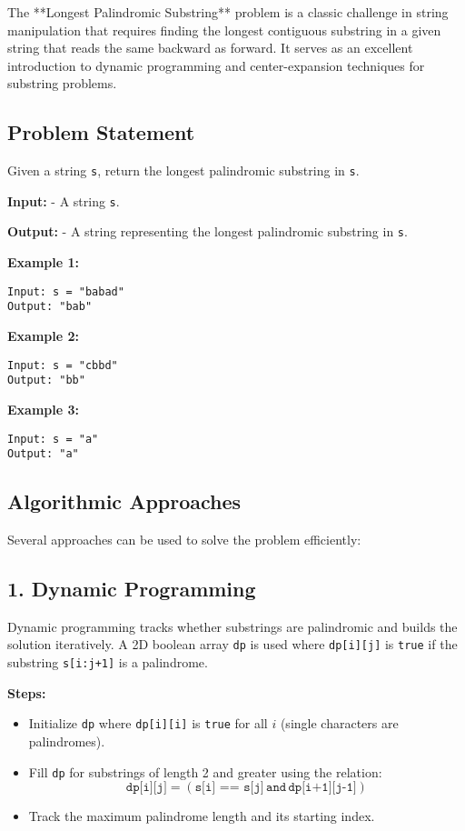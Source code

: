 
\label{problem:Longest_Palindromic_Substring}

The **Longest Palindromic Substring** problem is a classic challenge in string manipulation that requires finding the longest contiguous substring in a given string that reads the same backward as forward. It serves as an excellent introduction to dynamic programming and center-expansion techniques for substring problems.

\subsection*{Problem Statement}
Given a string \texttt{s}, return the longest palindromic substring in \texttt{s}.

\textbf{Input:}
- A string \texttt{s}.

\textbf{Output:}
- A string representing the longest palindromic substring in \texttt{s}.

\textbf{Example 1:}
\begin{verbatim}
Input: s = "babad"
Output: "bab"
\end{verbatim}

\textbf{Example 2:}
\begin{verbatim}
Input: s = "cbbd"
Output: "bb"
\end{verbatim}

\textbf{Example 3:}
\begin{verbatim}
Input: s = "a"
Output: "a"
\end{verbatim}

\subsection*{Algorithmic Approaches}
Several approaches can be used to solve the problem efficiently:

\subsection*{1. Dynamic Programming}
Dynamic programming tracks whether substrings are palindromic and builds the solution iteratively. A 2D boolean array \texttt{dp} is used where \texttt{dp[i][j]} is \texttt{true} if the substring \texttt{s[i:j+1]} is a palindrome.

\textbf{Steps:}
\begin{itemize}
    \item Initialize \texttt{dp} where \texttt{dp[i][i]} is \texttt{true} for all \(i\) (single characters are palindromes).
    \item Fill \texttt{dp} for substrings of length 2 and greater using the relation:
    \[
    \texttt{dp[i][j]} = (\texttt{s[i] == s[j]} \, \texttt{and} \, \texttt{dp[i+1][j-1]})
    \]
    \item Track the maximum palindrome length and its starting index.
\end{itemize}


